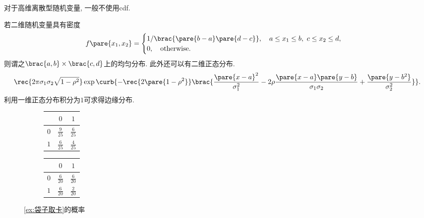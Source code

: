 \documentclass[../Statistics.tex]{subfiles}
\begin{document}
\begin{remark}
    对于高维离散型随机变量, 一般不使用cdf.
\end{remark}
若二维随机变量具有密度
\[ f\pare{x_1,x_2} = \begin{cases}
    1/\brac{\pare{b-a}\pare{d-c}},\quad a\le x_1 \le b,\ c\le x_2\le d,\\
    0,\quad \mathrm{otherwise}.
\end{cases} \]
则谓之$\brac{a,b}\times\brac{c,d}$上的均匀分布. 此外还可以有二维正态分布.
\begin{equation} \label{eq:二维正态分布} \rec{2\pi\sigma_1\sigma_2\sqrt{1-\rho^2}}\exp\curb{%
    -\rec{2\pare{1-\rho^2}} \brac{%
        \frac{\pare{x-a}^2}{\sigma_1^2}%
         - 2\rho \frac{\pare{x-a}\pare{y-b}}{\sigma_1\sigma_2} +%
        \frac{\pare{y-b^2}}{\sigma_2^2}%
    }%
}.
\end{equation}
利用一维正态分布积分为$1$可求得边缘分布.
        \begin{figure}[ht]
            \centering
            \begin{subfigure}{.45\textwidth}
                \centering
                \begin{tabular}{|c|c|c|}
                    \hline
                    \diagbox{$\xi$}{$\eta$} & $0$ & $1$ \\
                    \hline
                    $0$ & $\frac{9}{25}$ & $\frac{6}{25}$ \\
                    \hline
                    $1$ & $\frac{6}{25}$ & $\frac{4}{25}$ \\
                    \hline
                \end{tabular}
            \end{subfigure}
            \begin{subfigure}{.45\textwidth}
                \centering
                \begin{tabular}{|c|c|c|}
                    \hline
                    \diagbox{$\xi$}{$\eta$} & $0$ & $1$ \\
                    \hline
                    $0$ & $\frac{6}{20}$ & $\frac{6}{20}$ \\
                    \hline
                    $1$ & $\frac{6}{20}$ & $\frac{2}{20}$ \\
                    \hline
                \end{tabular}
            \end{subfigure}
            \caption{\cref{ex:袋子取卡}的概率}
            \label{fig:袋子取卡的概率}
        \end{figure}
\end{document}
